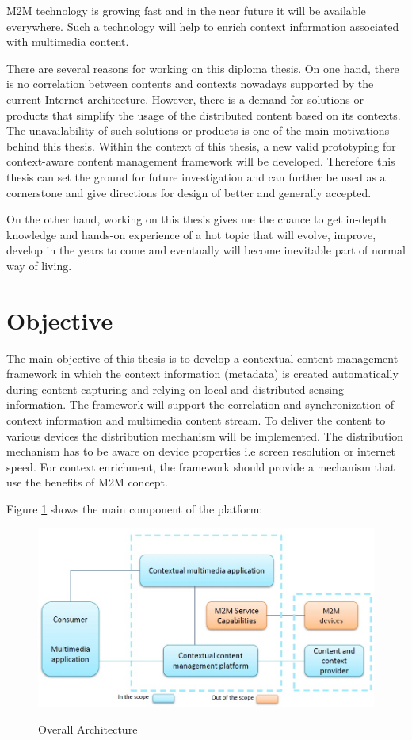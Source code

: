 \ac{M2M} technology is growing fast and in the near future it will be available everywhere. Such a technology will help to enrich context information associated with multimedia content.

There are several reasons for working on this diploma thesis. On one hand, there is no correlation between contents and contexts nowadays supported by the current Internet architecture. However, there is a demand for solutions or products that simplify the usage of the distributed content based on its contexts. The unavailability of such solutions or products is one of the main motivations behind this thesis. Within the context of this thesis, a new valid prototyping for context-aware content management framework will be developed. Therefore this thesis can set the ground for future investigation and can further be used as a cornerstone and give directions for design of better and generally accepted.

On the other hand, working on this thesis gives me the chance to get in-depth knowledge and hands-on experience of a hot topic that will evolve, improve, develop in the years to come and eventually will become inevitable part of normal way of living.

\section{Objective\label{sec:objective}}

The main objective of this thesis is to develop a contextual content management framework in which the context information (metadata) is created automatically during content capturing and relying on local and distributed sensing information. The framework will support the correlation and synchronization of context information and multimedia content stream. To deliver the content to various devices the distribution mechanism will be implemented. The distribution mechanism has to be aware on device properties i.e screen resolution or internet speed. For context enrichment, the framework should provide a mechanism that use the benefits of \ac{M2M} concept.

Figure \ref{fig:oarch} shows the main component of the platform:
\begin{figure}[htb]
  \centering
  \includegraphics[scale=0.5]{DA-OverallArchitecture.jpg}\\
  \caption{Overall Architecture}
  \label{fig:oarch}
\end{figure}


